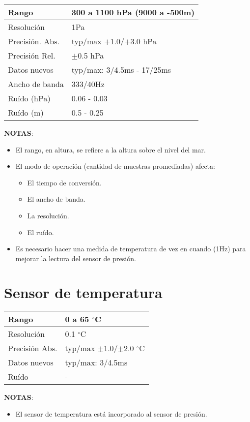 \documentclass[main]{subfiles}
\begin{document}
\begin{table}[H]
\begin{center}
\begin{tabular}{|p{3cm}|p{6.5cm}|}
\hline
Rango & 300 a 1100 hPa (9000 a -500m)\\
\hline
Resoluci\'on &  1Pa\\
\hline
Precisi\'on. Abs. & typ/max $\pm$1.0/$\pm$3.0 hPa \\
\hline
Precisi\'on Rel. & $\pm$0.5 hPa \\
\hline
Datos nuevos &  typ/max: 3/4.5ms - 17/25ms\\
\hline
Ancho de banda &  333/40Hz\\
\hline
Ru\'ido (hPa) &  0.06 - 0.03\\
\hline
Ru\'ido (m) & 0.5 - 0.25 \\
\hline
\end{tabular}
\label{tab:barometro}
\end{center}
\end{table}

\textbf{NOTAS}:
\begin{itemize}
\item El rango, en altura, se refiere a la altura sobre el nivel del mar.
\item El modo de operaci\'on (cantidad de muestras promediadas) afecta:
  \begin{itemize}
  \item El tiempo de conversi\'on.
  \item El ancho de banda.
  \item La resoluci\'on.
  \item El ru\'ido.
  \end{itemize}
\item Es necesario hacer una medida de temperatura de vez en cuando (1Hz) para mejorar la lectura del sensor de presi\'on.
\end{itemize}

\section{Sensor de temperatura}

\begin{table}[H]
\begin{center}
\begin{tabular}{|p{3cm}|p{6.5cm}|}
\hline
Rango & 0 a 65 $^\circ$C\\
\hline
Resoluci\'on &  0.1 $^\circ$C\\
\hline
Precisi\'on Abs. & typ/max $\pm$1.0/$\pm$2.0 $^\circ$C\\
\hline
Datos nuevos &  typ/max: 3/4.5ms\\
\hline
Ru\'ido & - \\
\hline
\end{tabular}
\label{tab:temp}
\end{center}
\end{table}

\textbf{NOTAS}:
\begin{itemize}
\item El sensor de temperatura est\'a incorporado al sensor de presi\'on.
\end{itemize}
\end{document}
